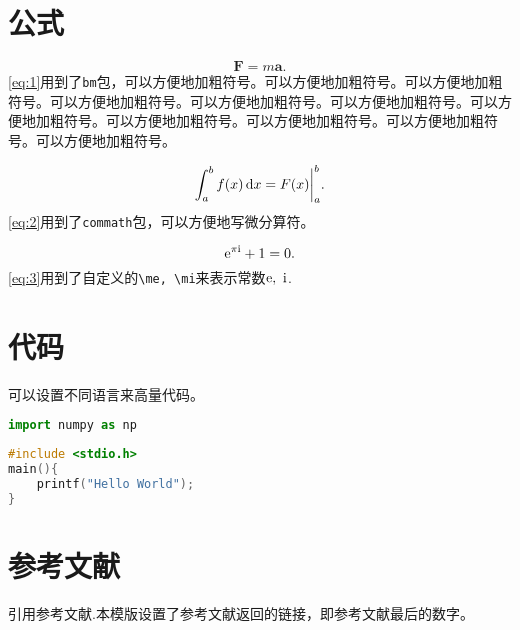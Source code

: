 \section{公式}


\begin{equation}
    \bm{F} = m\bm{a}.
    \label{eq:1}
\end{equation}
\cref{eq:1}用到了\texttt{bm}包，可以方便地加粗符号。可以方便地加粗符号。可以方便地加粗符号。可以方便地加粗符号。可以方便地加粗符号。可以方便地加粗符号。可以方便地加粗符号。可以方便地加粗符号。可以方便地加粗符号。可以方便地加粗符号。可以方便地加粗符号。

\begin{equation}
    \int^b_a f(x) \dif x=F(x)\bigg|^b_a.
    \label{eq:2}
\end{equation}
\cref{eq:2}用到了\texttt{commath}包，可以方便地写微分算符。

\begin{equation}
    \mathrm{e} ^{\pi \mathrm{i}} + 1 = 0.
    \label{eq:3}
\end{equation}
\cref{eq:3}用到了自定义的\verb"\me, \mi"来表示常数$\mathrm{e},\ \mathrm{i}$.

\section{代码}

可以设置不同语言来高量代码。

\begin{lstlisting}[language=python]
import numpy as np
\end{lstlisting}

\begin{lstlisting}[language=c]
#include <stdio.h>
main(){
    printf("Hello World");
}
\end{lstlisting}

\section{参考文献}

引用参考文献\cite{xie2019artificial2}.本模版设置了参考文献返回的链接，即参考文献最后的数字。
